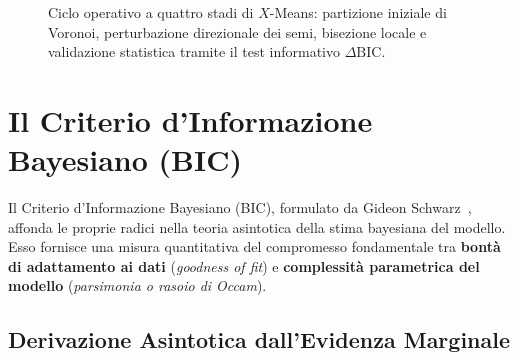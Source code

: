 \begin{figure}[htbp]
\caption{Ciclo operativo a quattro stadi di $X$-Means: partizione iniziale di Voronoi, perturbazione direzionale dei semi, bisezione locale e validazione statistica tramite il test informativo $\Delta\mathrm{BIC}$.}
\label{fig:dm-xmeans-cycle}
\end{figure}

\section{Il Criterio d'Informazione Bayesiano (BIC)}
\label{sec:dm-bic-theory}

Il Criterio d'Informazione Bayesiano (BIC), formulato da Gideon Schwarz~\cite{schwarz1978}, affonda le proprie radici nella teoria asintotica della stima bayesiana del modello. Esso fornisce una misura quantitativa del compromesso fondamentale tra \textbf{bontà di adattamento ai dati} (\textit{goodness of fit}) e \textbf{complessità parametrica del modello} (\textit{parsimonia o rasoio di Occam}).

\subsection{Derivazione Asintotica dall'Evidenza Marginale}

